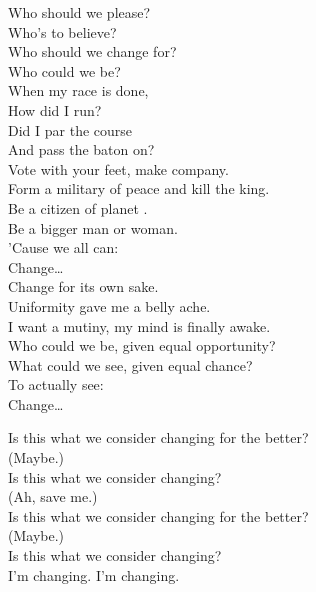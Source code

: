 
\label{album:changes}





Who should we please? \\
Who's to believe? \\
Who should we change for? \\
Who could we be? \\

When my race is done, \\
How did I run? \\
Did I par the course \\
And pass the baton on? \\

Vote with your feet, make company. \\
Form a military of peace and kill the king. \\
Be a citizen of planet . \\
Be a bigger man or woman. \\
'Cause we all can: \\

Change… \\

Change for its own sake. \\
Uniformity gave me a belly ache. \\
I want a mutiny, my mind is finally awake. \\
Who could we be, given equal opportunity? \\
What could we see, given equal chance? \\
To actually see: \\

Change… \\


Is this what we consider changing for the better? \\
(Maybe.) \\
Is this what we consider changing? \\
(Ah, save me.) \\
Is this what we consider changing for the better? \\
(Maybe.) \\
Is this what we consider changing? \\
I'm changing. I'm changing. \\

